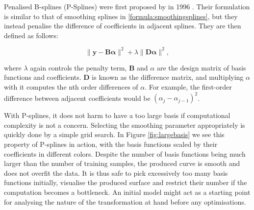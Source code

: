Penalised B-splines (P-Splines) were first proposed by \citeauthor{eilers1996flexible} in 1996 \cite{eilers1996flexible}. Their formulation is similar to that of smoothing splines in \ref{formula:smoothingsplines}, but they instead penalise the difference of coefficients in adjacent splines. They are then defined as follows:

\begin{equation}
\|\mathbf{y} - \mathbf{B}\boldsymbol{\alpha}\|^2 + \lambda \|\mathbf{D}\boldsymbol{\alpha}\|^2,
\label{formula:psplines}
\end{equation}

where $\lambda$ again controls the penalty term, $\mathbf{B}$ and ${\alpha}$ are the design matrix of basis functions and coefficients. $\mathbf{D}$ is known as the difference matrix, and multiplying $\alpha$ with it computes the nth order differences of $\alpha$. For example, the first-order difference between adjacent coefficients would be $(\alpha_j - \alpha_{j-1})^2$. \cite{eilers2021psplines}

With P-splines, it does not harm to have a too large basis if computational complexity is not a concern. Selecting the smoothing parameter appropriately is quickly done by a simple grid search. In Figure \ref{fig:largebasis} we see this property of P-splines in action, with the basis functions scaled by their coefficients in different colors. Despite the number of basis functions being much larger than the number of training samples, the produced curve is smooth and does not overfit the data. It is thus safe to pick excessively too many basis functions initially, visualise the produced surface and restrict their number if the computation becomes a bottleneck. \cite{eilers2021psplines} An initial model might act as a starting point for analysing the nature of the transformation at hand before any optimisations.



